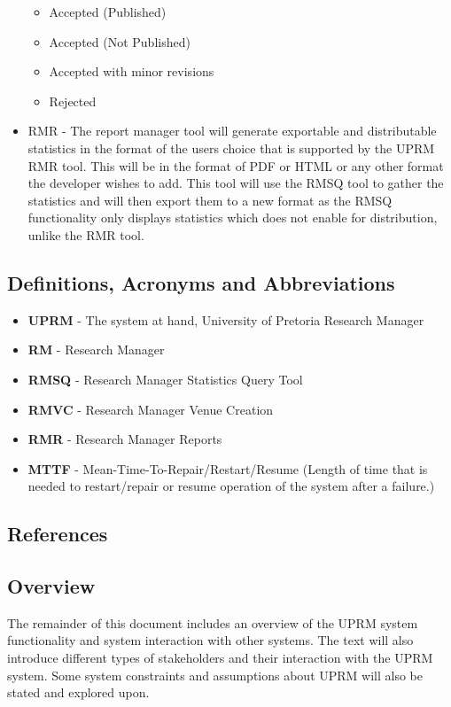 \begin{paragraph}{}
\begin{itemize}
						\begin{itemize}
							\item Accepted (Published)
							\item Accepted (Not Published)
							\item Accepted with minor revisions
							\item Rejected
						\end{itemize}
					\item RMR -
						The report manager tool will generate exportable and distributable statistics in the format of the users choice that is supported by the UPRM RMR tool. This will be in the format of PDF or HTML or any other format the developer wishes to add. This tool will use the RMSQ tool to gather the statistics and will then export them to a new format as the RMSQ functionality only displays statistics which does not enable for distribution, unlike the RMR tool.
				\end{itemize}
		\end{paragraph}

	\subsection{Definitions, Acronyms and Abbreviations}
		\begin{itemize}
			\item{\textbf{UPRM}} - The system at hand, University of Pretoria Research Manager
			\item{\textbf{RM}} - Research Manager 
			\item{\textbf{RMSQ}} - Research Manager Statistics Query Tool
			\item{\textbf{RMVC}} - Research Manager Venue Creation
			\item{\textbf{RMR}} - Research Manager Reports
			\item{\textbf{MTTF}} - Mean-Time-To-Repair/Restart/Resume (Length of time that is needed to restart/repair or resume operation of the system after a failure.)
			
		\end{itemize}
	\subsection{References}
		

	\subsection{Overview}
	The remainder of this document includes an overview of the UPRM system functionality and system interaction with other systems. The text will also introduce different types of stakeholders and their interaction with the UPRM system. Some system constraints and assumptions about UPRM will also be stated and explored upon.